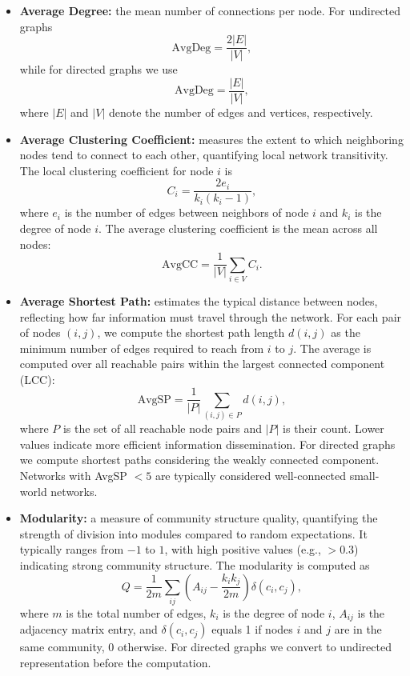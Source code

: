 \begin{itemize}
	\item \textbf{Average Degree:} the mean number of connections per node. For undirected graphs
	      $$\text{AvgDeg} = \frac{2|E|}{|V|},$$
	      while for directed graphs we use $$\text{AvgDeg} = \frac{|E|}{|V|},$$
	      where $|E|$ and $|V|$ denote the number of edges and vertices, respectively.

	\item \textbf{Average Clustering Coefficient:} measures the extent to which neighboring nodes tend to connect to each other, quantifying local network transitivity. The local clustering coefficient for node $i$ is
	      $$C_i = \frac{2e_i}{k_i(k_i-1)},$$
	      where $e_i$ is the number of edges between neighbors of node $i$ and $k_i$ is the degree of node $i$. The average clustering coefficient is the mean across all nodes:
	      $$\text{AvgCC} = \frac{1}{|V|}\sum_{i \in V} C_i.$$

	\item \textbf{Average Shortest Path:} estimates the typical distance between nodes, reflecting how far information must travel through the network. For each pair of nodes $(i,j)$, we compute the shortest path length $d(i,j)$ as the minimum number of edges required to reach from $i$ to $j$. The average is computed over all reachable pairs within the largest connected component (LCC):
	      $$\text{AvgSP} = \frac{1}{|P|}\sum_{(i,j) \in P} d(i,j),$$
	      where $P$ is the set of all reachable node pairs and $|P|$ is their count. Lower values indicate more efficient information dissemination. For directed graphs we compute shortest paths considering the weakly connected component. Networks with AvgSP $< 5$ are typically considered well-connected small-world networks.

	\item \textbf{Modularity:} a measure of community structure quality, quantifying the strength of division into modules compared to random expectations. It typically ranges from $-1$ to $1$, with high positive values (e.g., $> 0.3$) indicating strong community structure. The modularity is computed as
	      $$Q = \frac{1}{2m}\sum_{ij}\left(A_{ij} - \frac{k_i k_j}{2m}\right)\delta(c_i, c_j),$$
	      where $m$ is the total number of edges, $k_i$ is the degree of node $i$, $A_{ij}$ is the adjacency matrix entry, and $\delta(c_i, c_j)$ equals 1 if nodes $i$ and $j$ are in the same community, 0 otherwise. For directed graphs we convert to undirected representation before the computation.
\end{itemize}

